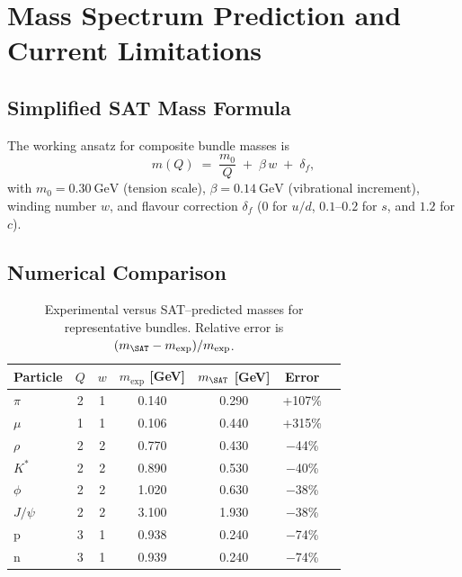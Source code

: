 

\section{Mass Spectrum Prediction and Current Limitations}
\label{sec:mass_spectrum}

\subsection{Simplified SAT Mass Formula}

The working ansatz for composite bundle masses is
\[
m(Q) \;=\; \frac{m_0}{Q} \;+\; \beta\,w \;+\; \delta_f ,
\]
with $m_0 = 0.30~\text{GeV}$ (tension scale),
$\beta = 0.14~\text{GeV}$ (vibrational increment),
winding number $w$, and flavour correction $\delta_f$ (0 for $u/d$, $0.1$--$0.2$
for $s$, and $1.2$ for $c$).

\subsection{Numerical Comparison}

\begin{table}[ht]
\centering
\caption{Experimental versus SAT--predicted masses for representative bundles.
Relative error is $(m_{\SAT} - m_{\exp})/m_{\exp}$.}
\label{tab:mass_compare}
\begin{tabular}{lcccccc}
\toprule
Particle & $Q$ & $w$ & $m_{\exp}$ [GeV] & $m_{\SAT}$ [GeV] & Error \\
\midrule
$\pi$ & 2 & 1 & 0.140 & 0.290 & +107\% \\
$\mu$ & 1 & 1 & 0.106 & 0.440 & +315\% \\
$\rho$ & 2 & 2 & 0.770 & 0.430 & −44\% \\
$K^{\!*}$ & 2 & 2 & 0.890 & 0.530 & −40\% \\
$\phi$ & 2 & 2 & 1.020 & 0.630 & −38\% \\
$J/\psi$ & 2 & 2 & 3.100 & 1.930 & −38\% \\
p & 3 & 1 & 0.938 & 0.240 & −74\% \\
n & 3 & 1 & 0.939 & 0.240 & −74\% \\

\bottomrule
\end{tabular}
\end{table}


